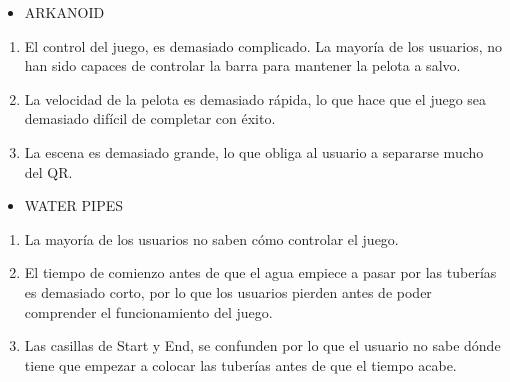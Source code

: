 \documentclass[]{article}
\begin{document}
\begin{itemize}
\itemsep1pt\parskip0pt
\item
  ARKANOID
\end{itemize}

\begin{enumerate}
\itemsep1pt\parskip0pt
\item
  El control del juego, es demasiado complicado. La mayoría de los
  usuarios, no han sido capaces de controlar la barra para mantener la
  pelota a salvo.
\end{enumerate}

\begin{enumerate}
\setcounter{enumi}{1}
\itemsep1pt\parskip0pt
\item
  La velocidad de la pelota es demasiado rápida, lo que hace que el
  juego sea demasiado difícil de completar con éxito.
\end{enumerate}

\begin{enumerate}
\setcounter{enumi}{2}
\itemsep1pt\parskip0pt
\item
  La escena es demasiado grande, lo que obliga al usuario a separarse
  mucho del QR.
\end{enumerate}

\begin{itemize}
\itemsep1pt\parskip0pt
\item
  WATER PIPES
\end{itemize}

\begin{enumerate}
\itemsep1pt\parskip0pt
\item
  La mayoría de los usuarios no saben cómo controlar el juego.
\end{enumerate}

\begin{enumerate}
\setcounter{enumi}{1}
\itemsep1pt\parskip0pt
\item
  El tiempo de comienzo antes de que el agua empiece a pasar por las
  tuberías es demasiado corto, por lo que los usuarios pierden antes de
  poder comprender el funcionamiento del juego.
\end{enumerate}

\begin{enumerate}
\setcounter{enumi}{2}
\itemsep1pt\parskip0pt
\item
  Las casillas de Start y End, se confunden por lo que el usuario no
  sabe dónde tiene que empezar a colocar las tuberías antes de que el
  tiempo acabe.
\end{enumerate}
\end{document}
